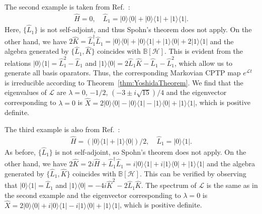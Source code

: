 \documentclass[preprint,pteplogo]{ptephy_v2}%
\numberwithin{equation}{section}
\theoremstyle{definition}
\newcommand{\mc}[1]{\mathcal{#1}}
\newcommand{\mbb}[1]{\mathbb{#1}}
\begin{document}
The second example is taken from Ref.~\cite{zhang2024criteria}:
\begin{align}
\hat{H} = 0, \quad 
\hat{L}_1 = | 0 \rangle \langle 0 | + | 0 \rangle \langle 1 | + | 1 \rangle \langle 1 |.
\end{align}
Here, $\{ \hat{L}_1 \}$ is not self-adjoint, and thus Spohn's theorem does not apply.
On the other hand, we have $2\hat{K} = \hat{L}_1^\dagger \hat{L}_1 = | 0 \rangle \langle 0 | + | 0 \rangle \langle 1 | + | 1 \rangle \langle 0 | +2 | 1 \rangle \langle 1 |$ and the algebra generated by $\{ \hat{L}_1, \hat{K} \}$ coincides with $\mbb{B}[\mc{H}]$. 
This is evident from the relations $| 0 \rangle \langle 1 | = \hat{L}_1^2 -\hat{L}_1$ and $| 1 \rangle \langle0 | = 2\hat{L}_1 \hat{K} -\hat{L}_1 -\hat{L}_1^2$, which allow us to generate all basis oparators.
Thus, the corresponding Markovian CPTP map $e^{\mc{L}t}$ is irreducible according to Theorem~\ref{thm:YoshidaTheorem}.
We find that the eigenvalues of $\mc{L}$ are $\lambda = 0$, $-1/2$, $(-3 \pm i \sqrt{15})/4$ and the eigenvector corresponding to $\lambda=0$ is $\hat{X} = 2 | 0 \rangle \langle 0 | - | 0 \rangle \langle 1 | - | 1 \rangle \langle 0 | + | 1 \rangle \langle 1 |$, which is positive definite.

The third example is also from Ref.~\cite{zhang2024criteria}:
\begin{align}
\hat{H} = (| 0 \rangle \langle 1 | + | 1 \rangle \langle 0 |)/2, \quad 
\hat{L}_1 = | 0 \rangle \langle 1 |.
\end{align}
As before, $\{ \hat{L}_1 \}$ is not self-adjoint, so Spohn's theorem does not apply.
On the other hand, we have $2\hat{K} = 2i\hat{H} +\hat{L}_1^\dagger \hat{L}_1 = i| 0 \rangle \langle 1 | + i| 1 \rangle \langle 0 | + | 1 \rangle \langle 1 |$ and the algebra generated by $\{ \hat{L}_1, \hat{K} \}$ coincides with $\mbb{B}[\mc{H}]$. 
This can be verified by observing that $| 0 \rangle \langle 1 | = \hat{L}_1$ and $| 1 \rangle \langle 0 | = -4i \hat{K}^2 -2 \hat{L}_1 \hat{K}$.
The spectrum of $\mc{L}$ is the same as in the second example and the eigenvector corresponding to $\lambda = 0$ is $\hat{X} = 2 | 0 \rangle \langle 0 | +i | 0 \rangle \langle 1 | -i | 1 \rangle \langle 0 | + | 1 \rangle \langle 1 |$, which is positive definite.
\end{document}
